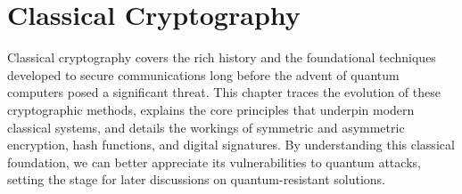 \newcommand{\imageplaceholder}[3][0.8\textwidth]{%
    \begin{figure}[ht]
    \centering
    \fbox{\parbox{#1}{
      \centering
      \textbf{Image Placeholder: #2} \\ \vspace{2mm}
      #3 \\ \vspace{2mm}
    }}
    \caption{#2}
    \label{fig:#3}
    \end{figure}
}

\graphicspath{{src/images/}} %

\chapter{Classical Cryptography}\label{chap:classical_crypto}

Classical cryptography covers the rich history and the foundational techniques developed to secure communications long before the advent of quantum computers posed a significant threat. This chapter traces the evolution of these cryptographic methods, explains the core principles that underpin modern classical systems, and details the workings of symmetric and asymmetric encryption, hash functions, and digital signatures. By understanding this classical foundation, we can better appreciate its vulnerabilities to quantum attacks, setting the stage for later discussions on quantum-resistant solutions.

